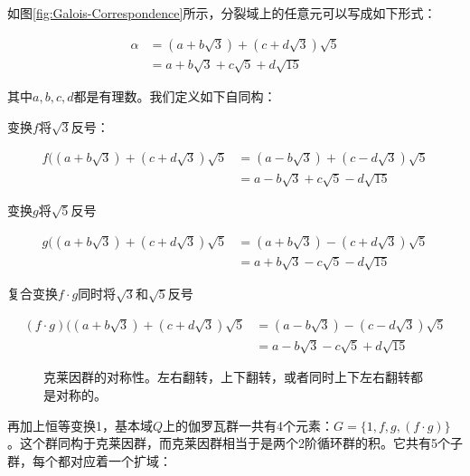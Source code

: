 \documentclass{article}
\begin{document}
如图\ref{fig:Galois-Correspondence}所示，分裂域上的任意元可以写成如下形式：

\[
\begin{array}{rl}
\alpha &= (a + b\sqrt{3}) + (c + d\sqrt{3}) \sqrt {5} \\
       &= a + b\sqrt{3} + c\sqrt{5} + d\sqrt{15}
\end{array}
\]

其中$a, b, c, d$都是有理数。我们定义如下自同构：

变换$f$将$\sqrt{3}$反号：

\[
\begin{array}{rl}
f((a + b\sqrt{3}) + (c + d\sqrt{3}) \sqrt {5} & = (a - b\sqrt{3}) + (c - d\sqrt{3})\sqrt{5} \\
 & = a - b\sqrt{3} + c\sqrt{5} - d\sqrt{15}
\end{array}
\]

变换$g$将$\sqrt{5}$反号

\[
\begin{array}{rl}
g((a + b\sqrt{3}) + (c + d\sqrt{3}) \sqrt {5} & = (a + b\sqrt{3}) - (c + d\sqrt{3})\sqrt{5} \\
 & = a + b\sqrt{3} - c\sqrt{5} - d\sqrt{15}
\end{array}
\]

复合变换$f \cdot g$同时将$\sqrt{3}$和$\sqrt{5}$反号

\[
\begin{array}{rl}
(f \cdot g)((a + b\sqrt{3}) + (c + d\sqrt{3}) \sqrt {5} & = (a - b\sqrt{3}) - (c - d\sqrt{3})\sqrt{5} \\
 & = a - b\sqrt{3} - c\sqrt{5} + d\sqrt{15}
\end{array}
\]

\begin{figure}
\centering
{}
\captionsetup{labelformat=empty}
\caption{克莱因群的对称性。左右翻转，上下翻转，或者同时上下左右翻转都是对称的。}
\label{fig:Klein-four-group}
\end{figure}

再加上恒等变换1，基本域$Q$上的伽罗瓦群一共有4个元素：$G = \{1, f, g, (f \cdot g)\}$。这个群同构于克莱因群，而克莱因群相当于是两个2阶循环群的积。它共有5个子群，每个都对应着一个扩域：
\end{document}
